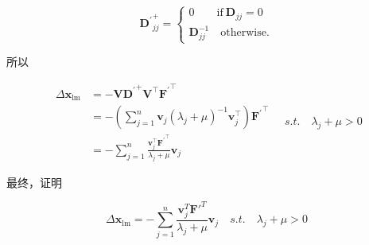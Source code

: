 \documentclass[12pt,a4paper,utf8]{article}
\begin{document}
$$
{\mathbf{D}^{\prime}}^{+}_{jj} = 
\begin{cases}
0 \qquad \text{if} \ \mathbf{D}_{jj} = 0 \\
\mathbf{D}_{jj}^{-1} \quad \text{otherwise}.
\end{cases}
$$

所以

$$
\begin{aligned}
\Delta \mathbf{x}_{\operatorname{lm}} 
&= 
-\mathbf{V} {\mathbf{D}^{\prime}}^{+} \mathbf{V}^{\top} {\mathbf{F}^{\prime}}^{\top} \\
&=
-\left(\sum_{j=1}^n \mathbf{v}_j (\lambda_j + \mu)^{-1} \mathbf{v}_j^{\top}\right) 
{\mathbf{F}^{\prime}}^{\top} \\
&=
-\sum_{j=1}^n \frac{\mathbf{v}_j^{\top} {\mathbf{F}^{\prime}}^{\top}}{\lambda_j + \mu} \mathbf{v}_j 
\end{aligned}
\quad s.t. \quad
\lambda_j + \mu > 0
$$

最终，证明

$$
\Delta \mathbf{x}_{\text{lm}} = 
-\sum_{j=1}^n \frac{\mathbf{v}_j^T \mathbf{F'}^T}{\lambda_j+\mu} \mathbf{v}_j
\quad s.t. \quad
\lambda_j + \mu > 0
$$




\end{document}

